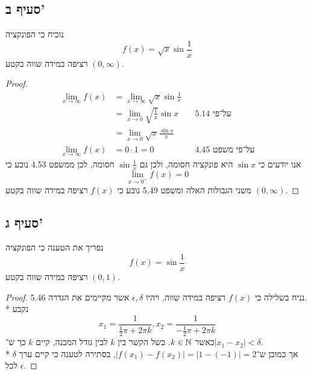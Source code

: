 \subsection{סעיף ב'}
נוכיח כי הפונקציה
\[
	f(x) = \sqrt{x} \sin \frac{1}{x}
\]
רציפה במידה שווה בקטע $(0, \infty)$.
\begin{proof}
	\begin{align*}
		\lim_{x \to \infty} f(x) & = \lim_{x \to \infty} \sqrt{x} \sin \frac{1}{x} \\
								 & = \lim_{x \to 0} \sqrt{\frac{1}{x}} \sin x && \text{על־פי 5.14} \\
								 & = \lim_{x \to 0} \sqrt{x} \frac{\sin x}{x} \\
		\lim_{x \to \infty} f(x) & = 0 \cdot 1 = 0 && \text{על־פי משפט 4.45}
	\end{align*}
	אנו יודעים כי $\sin x$ היא פונקציה חסומה, ולכן גם $\sin \frac{1}{x}$ חסומה, לכן ממשפט 4.53 נובע כי
	\[
		\lim_{x \to 0^+} f(x) = 0
	\]
	משני הגבולות האלה ומשפט 5.49 נובע כי $f(x)$ רציפה במידה שווה בקטע $(0, \infty)$.
\end{proof}

\subsection{סעיף ג'}
נפריך את הטענה כי הפונקציה
\[
	f(x) = \sin \frac{1}{x}
\]
רציפה במידה שווה בקטע $(0, 1)$.
\begin{proof}
	נניח בשלילה כי $f(x)$ רציפה במידה שווה, ויהיו $\epsilon, \delta$ אשר מקיימים את הגדרה 5.46. \\*
	נקבע
	\[
		x_1 = \frac{1}{\frac{1}{2} \pi + 2 \pi k},
		x_2 = \frac{1}{-\frac{1}{2} \pi + 2 \pi k}
	\]
	כאשר $k \in \mathbb{N}$. בשל הקשר בין $k$ לבין גודל המכנה, קיים $k$ כך ש־$|x_1 - x_2| < \delta$. \\*
	אך כמובן ש־$|f(x_1) - f(x_2)| = |1 - (-1)| = 2$, בסתירה לטענה כי קיים ערך $\delta$ לכל $\epsilon$.
\end{proof}

